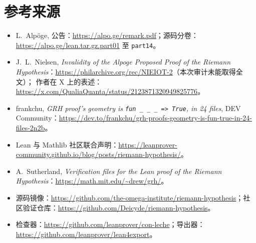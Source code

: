 \section{参考来源}

{\small\sloppy
\begin{itemize}
\item L.~Alpöge, 公告：\url{https://alpo.ge/remark.pdf}；源码分卷：\url{https://alpo.ge/lean.tar.gz.part01} 至 \texttt{part14}。
\item J.~L.~Nielsen, \emph{Invalidity of the Alpoge Proposed Proof of the Riemann Hypothesis}：\url{https://philarchive.org/rec/NIEIOT-2}（本次审计未能取得全文）；
作者在 X 上的表述：\url{https://x.com/QualiaQuanta/status/2123871320949825776}。
\item frankchu, \emph{GRH proof's geometry is \texttt{fun \_ \_ \_ => True}, in 24 files}, DEV Community：\url{https://dev.to/frankchu/grh-proofs-geometry-is-fun-true-in-24-files-2n2b}。
\item Lean 与 Mathlib 社区联合声明：\url{https://leanprover-community.github.io/blog/posts/riemann-hypothesis/}。
\item A.~Sutherland, \emph{Verification files for the Lean proof of the Riemann Hypothesis}：\url{https://math.mit.edu/~drew/grh/}。
\item 源码镜像：\url{https://github.com/the-omega-institute/riemann-hypothesis}；社区验证仓库：\url{https://github.com/Deicyde/riemann-hypothesis}。
\item 检查器：\url{https://github.com/leanprover/con-leche}；导出器：\url{https://github.com/leanprover/lean4export}。
\end{itemize}
}
